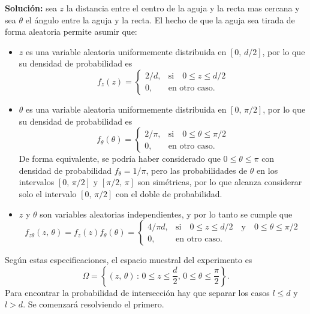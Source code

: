 \documentclass[a4paper]{report}
\begin{document}
\textbf{Solución:} sea \(z\) la distancia entre el centro de la aguja y la recta mas cercana y sea \(\theta\) el ángulo entre la aguja y la recta. El hecho de que la aguja sea tirada de forma aleatoria permite asumir que:
\begin{itemize}
 \item \(z\) es una variable aleatoria uniformemente distribuida en \([0,\,d/2]\), por lo que su densidad de probabilidad es
 \[
  f_z(z)=\left\{\begin{array}{ll}
  2/d, &  \textrm{si}\quad0\leq z\leq d/2\\
  0, & \textrm{en otro caso.}
 \end{array} \right.
 \]
 \item \(\theta\) es una variable aleatoria uniformemente distribuida en \([0,\,\pi/2]\), por lo que su densidad de probabilidad es
 \[
  f_\theta(\theta)=\left\{\begin{array}{ll}
  2/\pi, &  \textrm{si}\quad0\leq\theta\leq \pi/2\\
  0, & \textrm{en otro caso.}
 \end{array} \right.
 \]
 De forma equivalente, se podría haber considerado que \(0\leq\theta\leq\pi\) con densidad de probabilidad \(f_\theta=1/\pi\), pero las probabilidades de \(\theta\) en los intervalos \([0,\,\pi/2]\) y \([\pi/2,\,\pi]\) son simétricas, por lo que alcanza considerar solo el intervalo \([0,\,\pi/2]\) con el doble de probabilidad.
 \item \(z\) y \(\theta\) son variables aleatorias independientes, y por lo tanto se cumple que
 \[
  f_{z\theta}(z,\,\theta)=f_z(z)f_\theta(\theta)
  =\left\{\begin{array}{ll}
  4/\pi d, &  \textrm{si}\quad0\leq z\leq d/2\quad\textrm{y}\quad0\leq\theta\leq \pi/2\\
  0, & \textrm{en otro caso.}
 \end{array} \right.
 \]
\end{itemize}
Según estas especificaciones, el espacio muestral del experimento es
\[
 \Omega=\left\{(z,\,\theta)\,:\,0\leq z\leq\frac{d}{2},\,0\leq\theta\leq\frac{\pi}{2}\right\}.
\]
Para encontrar la probabilidad de intersección hay que separar los casos \(l\leq d\) y \(l>d\). Se comenzará resolviendo el primero.
\end{document}
